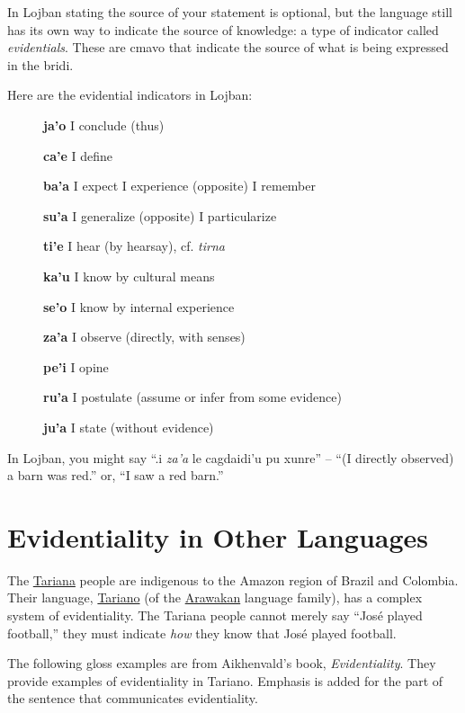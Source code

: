 \documentclass[12pt]{book}
\begin{document}
In Lojban stating the source of your statement is optional, but the language still has its own way to indicate the source of knowledge: a type of indicator called \emph{evidentials}. These are cmavo that indicate the source of what is being expressed in the bridi.

Here are the evidential indicators in Lojban:

\begin{description}
	\item[ ] \textbf{ja'o} I conclude (thus)
	\item[ ] \textbf{ca'e} I define
	\item[ ] \textbf{ba'a} I expect \textbar {} I experience \textbar {} (opposite) I remember
	\item[ ] \textbf{su'a} I generalize \textbar {} (opposite) I particularize
	\item[ ] \textbf{ti'e} I hear (by hearsay), cf. \emph{tirna}
	\item[ ] \textbf{ka'u} I know by cultural means
	\item[ ] \textbf{se'o} I know by internal experience
	\item[ ] \textbf{za'a} I observe (directly, with senses)
	\item[ ] \textbf{pe'i} I opine
	\item[ ] \textbf{ru'a} I postulate (assume or infer from some evidence)
	\item[ ] \textbf{ju'a} I state (without evidence)
\end{description}

In Lojban, you might say ``.i \emph{za'a} le cagdaidi'u pu xunre'' -- ``(I directly observed) a barn was red.'' or, ``I saw a red barn.''

\section{Evidentiality in Other Languages}

The \href{https://en.wikipedia.org/wiki/Tariana}{Tariana} people are indigenous to the Amazon region of Brazil and Colombia. Their language, \href{https://en.wikipedia.org/wiki/Tariana_language}{Tariano} (of the \href{https://en.wikipedia.org/wiki/Arawakan_languages}{Arawakan} language family), has a complex system of evidentiality. The Tariana people cannot merely say ``Jos{\'e} played football,'' they must indicate \emph{how} they know that Jos{\'e} played football.~\cite[p.~2]{Aikhenvald2004}

The following gloss examples are from Aikhenvald's book, \textit{Evidentiality}. They provide examples of evidentiality in Tariano. Emphasis is added for the part of the sentence that communicates evidentiality. 
\end{document}
